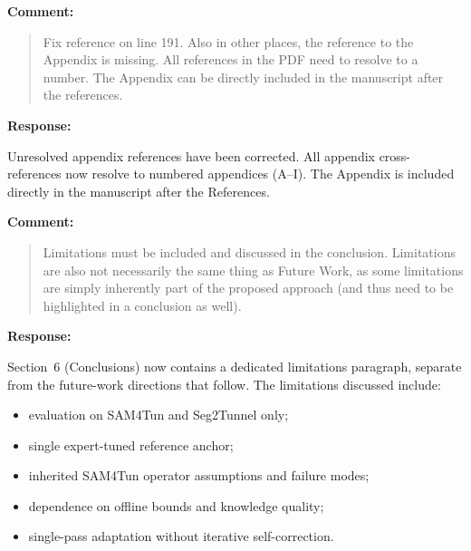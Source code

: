 \documentclass[11pt,a4paper]{article}
\newenvironment{commentblock}{%
  \par\smallskip\noindent\textbf{Comment:}\par
  \begin{quote}\itshape\color{black}
}{%
  \end{quote}\smallskip
}
\newenvironment{responseblock}{%
  \par\smallskip\noindent\textbf{Response:}\par
  \begingroup\color{responsegreen}
}{%
  \endgroup\smallskip
}
\begin{document}
\begin{commentblock}
Fix reference on line 191. Also in other places, the reference to the Appendix is missing. All references in the PDF need to resolve to a number. The Appendix can be directly included in the manuscript after the references.
\end{commentblock}
\begin{responseblock}
Unresolved appendix references have been corrected. All appendix cross-references now resolve to numbered appendices (A--I). The Appendix is included directly in the manuscript after the References.
\end{responseblock}

\begin{commentblock}
Limitations must be included and discussed in the conclusion. Limitations are also not necessarily the same thing as Future Work, as some limitations are simply inherently part of the proposed approach (and thus need to be highlighted in a conclusion as well).
\end{commentblock}
\begin{responseblock}
Section~6 (Conclusions) now contains a dedicated limitations paragraph, separate from the future-work directions that follow. The limitations discussed include:
\begin{itemize}[nosep]
  \item evaluation on SAM4Tun and Seg2Tunnel only;
  \item single expert-tuned reference anchor;
  \item inherited SAM4Tun operator assumptions and failure modes;
  \item dependence on offline bounds and knowledge quality;
  \item single-pass adaptation without iterative self-correction.
\end{itemize}
\end{responseblock}
\end{document}
